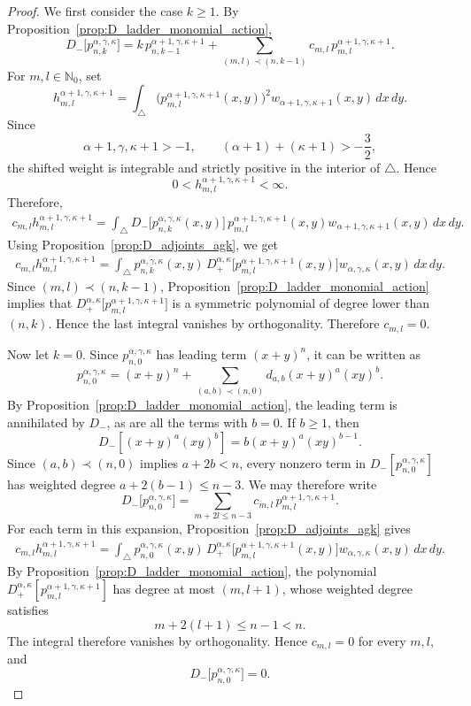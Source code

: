 \documentclass[reqno,10pt]{amsart}
\theoremstyle{plain}
\numberwithin{equation}{section}
\numberwithin{figure}{section}
\begin{document}
\begin{proof}
We first consider the case \(k\geq1\). By
Proposition~\ref{prop:D_ladder_monomial_action},
\[
D_{-}\big[p_{n,k}^{\alpha,\gamma,\kappa}\big]
=
k\,p_{n,k-1}^{\alpha+1,\gamma,\kappa+1}
+
\sum_{(m,l)\prec(n,k-1)}
c_{m,l}\,p_{m,l}^{\alpha+1,\gamma,\kappa+1}.
\]
For \(m,l\in\mathbb N_0\), set
\[
h_{m,l}^{\alpha+1,\gamma,\kappa+1}
=
\int_{\triangle}
\bigl(p_{m,l}^{\alpha+1,\gamma,\kappa+1}(x,y)\bigr)^2
w_{\alpha+1,\gamma,\kappa+1}(x,y)\,dx\,dy .
\]
Since
\[
\alpha+1,\gamma,\kappa+1>-1,
\qquad
(\alpha+1)+(\kappa+1)>-\frac32,
\]
the shifted weight is integrable and strictly positive in the interior
of $\triangle$. Hence
\[
0<h_{m,l}^{\alpha+1,\gamma,\kappa+1}<\infty.
\]
Therefore,
\[
\begin{aligned}
c_{m,l}h_{m,l}^{\alpha+1,\gamma,\kappa+1}
=
\int_{\triangle}
D_{-}\big[p_{n,k}^{\alpha,\gamma,\kappa}(x,y)\big]\,
p_{m,l}^{\alpha+1,\gamma,\kappa+1}(x,y) w_{\alpha+1,\gamma,\kappa+1}(x,y)\,dx\,dy .
\end{aligned}
\]
Using Proposition~\ref{prop:D_adjoints_agk}, we get
\[
\begin{aligned}
c_{m,l}h_{m,l}^{\alpha+1,\gamma,\kappa+1}
=
\int_{\triangle}
p_{n,k}^{\alpha,\gamma,\kappa}(x,y)\,
D_{+}^{\alpha,\kappa}
\big[p_{m,l}^{\alpha+1,\gamma,\kappa+1}(x,y)\big]
w_{\alpha,\gamma,\kappa}(x,y)\,dx\,dy .
\end{aligned}
\]
Since $(m,l)\prec(n,k-1)$, Proposition~\ref{prop:D_ladder_monomial_action}
implies that $D_{+}^{\alpha,\kappa}
\big[p_{m,l}^{\alpha+1,\gamma,\kappa+1}\big]$ is a symmetric polynomial of degree lower than $(n,k)$. Hence the last
integral vanishes by orthogonality. Therefore $c_{m,l}=0$.

Now let \(k=0\). Since
\(p_{n,0}^{\alpha,\gamma,\kappa}\) has leading term \((x+y)^n\), it can
be written as
\[
p_{n,0}^{\alpha,\gamma,\kappa}
=
(x+y)^n
+
\sum_{(a,b)\prec(n,0)}
d_{a,b}(x+y)^a(xy)^b .
\]
By Proposition~\ref{prop:D_ladder_monomial_action}, the leading term is
annihilated by \(D_-\), as are all the terms with \(b=0\). If \(b\geq1\),
then
\[
D_-\left[(x+y)^a(xy)^b\right]
=
b(x+y)^a(xy)^{b-1}.
\]
Since \((a,b)\prec(n,0)\) implies \(a+2b<n\), every nonzero term in
\(D_-[p_{n,0}^{\alpha,\gamma,\kappa}]\) has weighted degree
\(
a+2(b-1)\leq n-3
\). We may therefore write
\[
D_-\big[p_{n,0}^{\alpha,\gamma,\kappa}\big]
=
\sum_{m+2l\leq n-3}
c_{m,l}\,
p_{m,l}^{\alpha+1,\gamma,\kappa+1}.
\]
For each term in this expansion, Proposition~\ref{prop:D_adjoints_agk}
gives
\[
\begin{aligned}
c_{m,l}h_{m,l}^{\alpha+1,\gamma,\kappa+1}
=
\int_{\triangle}
p_{n,0}^{\alpha,\gamma,\kappa}(x,y)\,
D_+^{\alpha,\kappa}
\big[p_{m,l}^{\alpha+1,\gamma,\kappa+1}(x,y)\big]
w_{\alpha,\gamma,\kappa}(x,y)\,dx\,dy .
\end{aligned}
\]
By Proposition~\ref{prop:D_ladder_monomial_action}, the polynomial
\(D_+^{\alpha,\kappa}
[p_{m,l}^{\alpha+1,\gamma,\kappa+1}]\) has degree at most
\((m,l+1)\), whose weighted degree satisfies
\[
m+2(l+1)\leq n-1<n.
\]
The integral therefore vanishes by orthogonality. Hence
\(c_{m,l}=0\) for every \(m,l\), and
\[
D_-\big[p_{n,0}^{\alpha,\gamma,\kappa}\big]=0.
\]


\end{proof}
\end{document}
